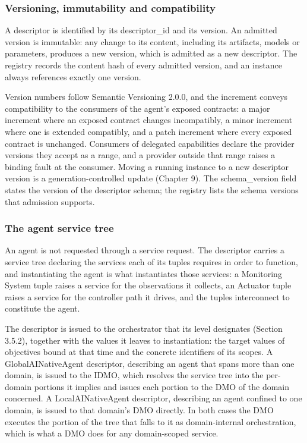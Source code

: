 \hypertarget{versioning-immutability-and-compatibility}{%
\subsubsection{Versioning, immutability and compatibility}\label{versioning-immutability-and-compatibility}}

A descriptor is identified by its descriptor\_\allowbreak{}id and its
version. An admitted version is immutable: any change to its content,
including its artifacts, models or parameters, produces a new version,
which is admitted as a new descriptor. The registry records the content
hash of every admitted version, and an instance always references
exactly one version.

Version numbers follow Semantic Versioning 2.0.0, and the increment
conveys compatibility to the consumers of the agent's exposed contracts:
a major increment where an exposed contract changes incompatibly, a
minor increment where one is extended compatibly, and a patch increment
where every exposed contract is unchanged. Consumers of delegated
capabilities declare the provider versions they accept as a range, and a
provider outside that range raises a binding fault at the consumer.
Moving a running instance to a new descriptor version is a
generation-controlled update (Chapter 9). The
schema\_\allowbreak{}version field states the version of the descriptor
schema; the registry lists the schema versions that admission supports.

\hypertarget{the-agent-service-tree}{%
\subsubsection{The agent service tree}\label{the-agent-service-tree}}

An agent is not requested through a service request. The descriptor
carries a service tree declaring the services each of its tuples
requires in order to function, and instantiating the agent is what
instantiates those services: a Monitoring System tuple raises a service
for the observations it collects, an Actuator tuple raises a service for
the controller path it drives, and the tuples interconnect to constitute
the agent.

The descriptor is issued to the orchestrator that its level designates
(Section 3.5.2), together with the values it leaves to instantiation:
the target values of objectives bound at that time and the concrete
identifiers of its scopes. A GlobalAINativeAgent descriptor, describing
an agent that spans more than one domain, is issued to the IDMO, which
resolves the service tree into the per-domain portions it implies and
issues each portion to the DMO of the domain concerned. A
LocalAINativeAgent descriptor, describing an agent confined to one
domain, is issued to that domain's DMO directly. In both cases the DMO
executes the portion of the tree that falls to it as domain-internal
orchestration, which is what a DMO does for any domain-scoped service.

